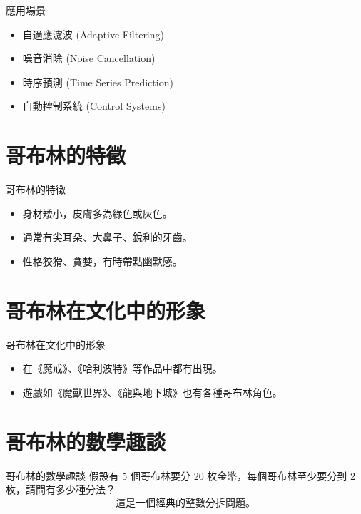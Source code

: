\documentclass{beamer}
\begin{document}
\begin{frame}{應用場景}
\begin{itemize}
\item 自適應濾波 (Adaptive Filtering)
\item 噪音消除 (Noise Cancellation)
\item 時序預測 (Time Series Prediction)
\item 自動控制系統 (Control Systems)
\end{itemize}
\end{frame}

\section{哥布林的特徵}
\begin{frame}{哥布林的特徵}
    \begin{itemize}
        \item 身材矮小，皮膚多為綠色或灰色。
        \item 通常有尖耳朵、大鼻子、銳利的牙齒。
        \item 性格狡猾、貪婪，有時帶點幽默感。
    \end{itemize}
\end{frame}

\section{哥布林在文化中的形象}
\begin{frame}{哥布林在文化中的形象}
    \begin{itemize}
        \item 在《魔戒》、《哈利波特》等作品中都有出現。
        \item 遊戲如《魔獸世界》、《龍與地下城》也有各種哥布林角色。
    \end{itemize}
\end{frame}

\section{哥布林的數學趣談}
\begin{frame}{哥布林的數學趣談}
    假設有 5 個哥布林要分 20 枚金幣，每個哥布林至少要分到 2 枚，請問有多少種分法？
    \[
    \text{這是一個經典的整數分拆問題。}
    \]
\end{frame}
\end{document}
